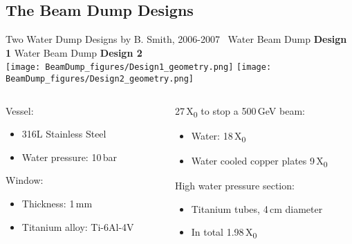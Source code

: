 \documentclass[xcolor={dvipsnames}]{beamer}
\begin{document}
\subsection{The Beam Dump Designs}
\begin{frame}{Two Water Dump Designs by B. Smith, 2006-2007~\cite{Smith}}
  \hspace*{0.5cm} Water Beam Dump \textbf{Design 1} \hfill Water Beam Dump \alert{\textbf{Design 2}} \hspace*{0.5cm} \\
  \texttt{[image: BeamDump\_figures/Design1\_geometry.png]}
  \hspace*{0.1cm}
  \texttt{[image: BeamDump\_figures/Design2\_geometry.png]}
\begin{columns}[T]
 \begin{column}{0.5\textwidth}
   Vessel:
  \begin{itemize}
   \item 316L Stainless Steel
   \item Water pressure: 10\,bar
  \end{itemize}
    Window:
  \begin{itemize}
   \item Thickness: 1\,mm
   \item Titanium alloy: Ti-6Al-4V 
  \end{itemize}
 \end{column}
 \begin{column}{0.5\textwidth}
    27\,X\textsubscript{0} to stop a 500\,GeV beam:
  \begin{itemize}
   \item Water: 18\,X\textsubscript{0}
   \item Water cooled copper plates 9\,X\textsubscript{0}
  \end{itemize}  
    \alert{High water pressure section:}
  \begin{itemize}
   \item \alert{Titanium tubes, 4\,cm diameter }
   \item \alert{In total 1.98\,X\textsubscript{0} }
  \end{itemize} 
 \end{column}
\end{columns}

\end{frame}
\end{document}
